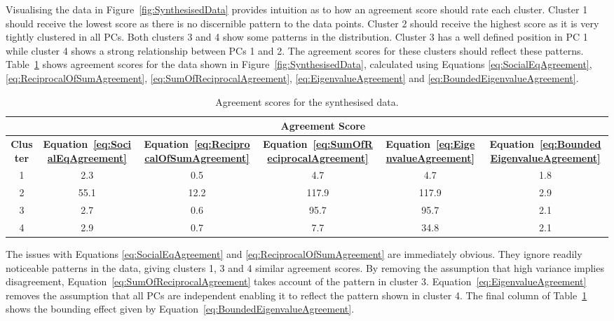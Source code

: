 			Visualising the data in Figure~\ref{fig:SynthesisedData} provides intuition as to how an agreement
			score should rate each cluster. Cluster 1 should receive the lowest score as there is no
			discernible pattern to the data points. Cluster 2 should receive the highest score as it is very
			tightly clustered in all PCs. Both clusters 3 and 4 show some patterns in the distribution.
			Cluster 3 has a well defined position in PC 1 while cluster 4 shows a strong relationship between
			PCs 1 and 2. The agreement scores for these clusters should reflect these patterns.
			Table~\ref{tab:SynthesisedDataAgreement} shows agreement scores for the data shown in
			Figure~\ref{fig:SynthesisedData}, calculated using Equations \ref{eq:SocialEqAgreement},
			\ref{eq:ReciprocalOfSumAgreement}, \ref{eq:SumOfReciprocalAgreement}, \ref{eq:EigenvalueAgreement}
			and \ref{eq:BoundedEigenvalueAgreement}.

			\begin{table}[h!]
				\centering
				\begin{tabular}{|c|c|c|c|c|c|}
					\cline{2-6}
					\multicolumn{1}{c|}{} & \multicolumn{5}{c|}{\bf{Agreement Score}} \tabularnewline
					\hline
					\bf{Cluster} & \bf{Equation~\ref{eq:SocialEqAgreement}} & 
					\bf{Equation~\ref{eq:ReciprocalOfSumAgreement}} &
					\bf{Equation~\ref{eq:SumOfReciprocalAgreement}} & 
					\bf{Equation~\ref{eq:EigenvalueAgreement}} &
					\bf{Equation~\ref{eq:BoundedEigenvalueAgreement}} \tabularnewline
					\hline
					\hline
					1 & 2.3 & 0.5 & 4.7 & 4.7 & 1.8 \tabularnewline
					\hline
					2 & 55.1 & 12.2 & 117.9 & 117.9 & 2.9 \tabularnewline
					\hline
					3 & 2.7 & 0.6 & 95.7 & 95.7 & 2.1 \tabularnewline
					\hline
					4 & 2.9 & 0.7 & 7.7 & 34.8 & 2.1 \tabularnewline
					\hline
				\end{tabular}
				\caption{Agreement scores for the synthesised data.}
				\label{tab:SynthesisedDataAgreement}
			\end{table}

			The issues with Equations \ref{eq:SocialEqAgreement} and \ref{eq:ReciprocalOfSumAgreement} are
			immediately obvious. They ignore readily noticeable patterns in the data, giving clusters 1, 3 and
			4 similar agreement scores. By removing the assumption that high variance implies disagreement,
			Equation~\ref{eq:SumOfReciprocalAgreement} takes account of the pattern in cluster 3.
			Equation~\ref{eq:EigenvalueAgreement} removes the assumption that all PCs are independent enabling
			it to reflect the pattern shown in cluster 4. The final column of
			Table~\ref{tab:SynthesisedDataAgreement} shows the bounding effect given by
			Equation~\ref{eq:BoundedEigenvalueAgreement}.

